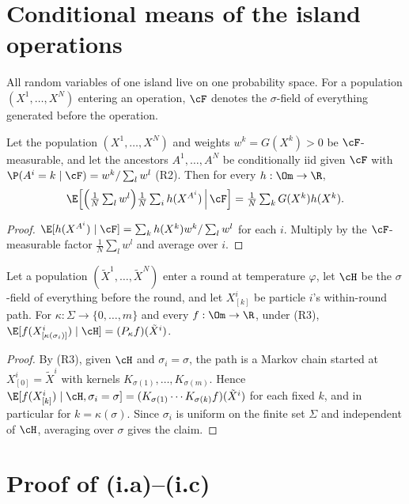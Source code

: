 \documentclass[11pt]{report}
\begin{document}
\section{Conditional means of the island operations}

All random variables of one island live on one probability space. For a population $(X^1,\dots,X^N)$ entering an operation, $\cF$ denotes the $\sigma$-field of everything generated before the operation.

\begin{T12lemma}[resampling]\label{T12:lem:res}
Let the population $(X^1,\dots,X^N)$ and weights $w^k=G(X^k)>0$ be $\cF$-measurable, and let the ancestors $A^1,\dots,A^N$ be conditionally iid given $\cF$ with $\P(A^i=k\mid\cF)=w^k/\sum_lw^l$ (R2). Then for every $h:\Om\to\R$,
\[ \E\Big[\Big(\tfrac1N\textstyle\sum_lw^l\Big)\tfrac1N\textstyle\sum_i h(X^{A^i})\,\Big|\,\cF\Big]=\tfrac1N\textstyle\sum_k G(X^k)h(X^k). \]
\end{T12lemma}
\begin{proof}
$\E[h(X^{A^i})\mid\cF]=\sum_kh(X^k)w^k/\sum_lw^l$ for each $i$. Multiply by the $\cF$-measurable factor $\frac1N\sum_lw^l$ and average over $i$.
\end{proof}

\begin{T12lemma}\label{T12:lem:round}
Let a population $(\tilde X^1,\dots,\tilde X^N)$ enter a round at temperature $\varphi$, let $\cH$ be the $\sigma$-field of everything before the round, and let $X^i_{[k]}$ be particle $i$'s within-round path. For $\kappa:\Sigma\to\{0,\dots,m\}$ and every $f:\Om\to\R$, under (R3), $\E[f(X^i_{[\kappa(\sigma_i)]})\mid\cH]=(P_\kappa f)(\tilde X^i)$.
\end{T12lemma}
\begin{proof}
By (R3), given $\cH$ and $\sigma_i=\sigma$, the path is a Markov chain started at $X^i_{[0]}=\tilde X^i$ with kernels $K_{\sigma(1)},\dots,K_{\sigma(m)}$. Hence $\E[f(X^i_{[k]})\mid\cH,\sigma_i=\sigma]=(K_{\sigma(1)}\cdots K_{\sigma(k)}f)(\tilde X^i)$ for each fixed $k$, and in particular for $k=\kappa(\sigma)$. Since $\sigma_i$ is uniform on the finite set $\Sigma$ and independent of $\cH$, averaging over $\sigma$ gives the claim.
\end{proof}

\section{Proof of (i.a)--(i.c)}
\end{document}
